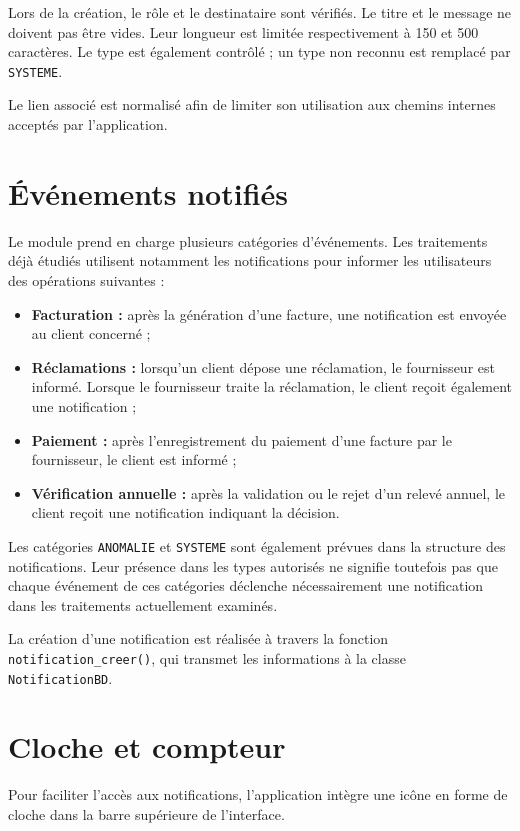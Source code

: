 Lors de la création, le rôle et le destinataire sont vérifiés. Le titre et le message ne doivent pas être vides. Leur longueur est limitée respectivement à 150 et 500 caractères. Le type est également contrôlé ; un type non reconnu est remplacé par \texttt{SYSTEME}.

Le lien associé est normalisé afin de limiter son utilisation aux chemins internes acceptés par l'application.

\section{Événements notifiés}

Le module prend en charge plusieurs catégories d'événements. Les traitements déjà étudiés utilisent notamment les notifications pour informer les utilisateurs des opérations suivantes :

\begin{itemize}
    \item \textbf{Facturation :} après la génération d'une facture, une notification est envoyée au client concerné ;
    \item \textbf{Réclamations :} lorsqu'un client dépose une réclamation, le fournisseur est informé. Lorsque le fournisseur traite la réclamation, le client reçoit également une notification ;
    \item \textbf{Paiement :} après l'enregistrement du paiement d'une facture par le fournisseur, le client est informé ;
    \item \textbf{Vérification annuelle :} après la validation ou le rejet d'un relevé annuel, le client reçoit une notification indiquant la décision.
\end{itemize}

Les catégories \texttt{ANOMALIE} et \texttt{SYSTEME} sont également prévues dans la structure des notifications. Leur présence dans les types autorisés ne signifie toutefois pas que chaque événement de ces catégories déclenche nécessairement une notification dans les traitements actuellement examinés.

La création d'une notification est réalisée à travers la fonction \texttt{notification\_creer()}, qui transmet les informations à la classe \texttt{NotificationBD}.

\section{Cloche et compteur}

Pour faciliter l'accès aux notifications, l'application intègre une icône en forme de cloche dans la barre supérieure de l'interface.

